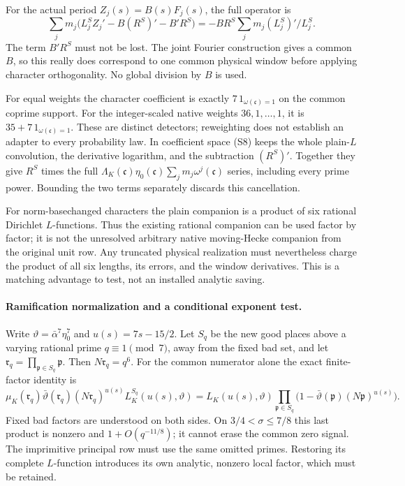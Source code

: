 \documentclass[11pt]{article}
\begin{document}
For the actual period \(Z_j(s)=B(s)F_j(s)\), the full operator is
\[
 \sum_jm_j\bigl(L_j^S Z_j'-B(R^S)'-B'R^S\bigr)
   =-BR^S\sum_jm_j(L_j^S)'/L_j^S .
 \tag{S8a}
\]
The term \(B'R^S\) must not be lost. The joint Fourier construction
gives a common \(B\), so this really does correspond to one common
physical window before applying character orthogonality. No global
division by \(B\) is used.

For equal weights the character coefficient is exactly
\(7\,1_{\omega(\mathfrak c)=1}\) on the common coprime support.
For the integer-scaled native weights \(36,1,\ldots,1\), it is
\(35+7\,1_{\omega(\mathfrak c)=1}\). These are distinct detectors;
reweighting does not establish an adapter to every probability law.
In coefficient space (S8) keeps the whole plain-\(L\) convolution,
the derivative logarithm, and the subtraction \((R^S)'\).
Together they give \(R^S\) times the full
\(\Lambda_K(\mathfrak c)\eta_0(\mathfrak c)
\sum_jm_j\omega^j(\mathfrak c)\) series, including every prime power.
Bounding the two terms separately discards this cancellation.

For norm-basechanged characters the plain companion is a product
of six rational Dirichlet \(L\)-functions. Thus the existing rational
companion can be used factor by factor; it is not the unresolved
arbitrary native moving-Hecke companion from the original unit row.
Any truncated physical realization must nevertheless charge the
product of all six lengths, its errors, and the window derivatives.
This is a matching advantage to test, not an installed analytic saving.

\paragraph{Ramification normalization and a conditional exponent test.}
Write \(\vartheta=\bar\alpha^7\eta_0^7\) and
\(u(s)=7s-15/2\). Let \(S_q\) be the new good places above a varying
rational prime \(q\equiv1\pmod7\), away from the fixed bad set, and
let \(\mathfrak r_q=\prod_{\mathfrak p\in S_q}\mathfrak p\).
Then \(N\mathfrak r_q=q^6\).
For the common numerator alone the exact finite-factor identity is
\[
 \mu_K(\mathfrak r_q)\bar\vartheta(\mathfrak r_q)
 (N\mathfrak r_q)^{u(s)}
 L_K^{S_q}(u(s),\vartheta)
 =
 L_K(u(s),\vartheta)
 \prod_{\mathfrak p\in S_q}
       \bigl(1-\bar\vartheta(\mathfrak p)(N\mathfrak p)^{u(s)}\bigr).
 \tag{S9}
\]
Fixed bad factors are understood on both sides.
On \(3/4<\sigma\le7/8\) this last product is nonzero and
\(1+O(q^{-11/8})\); it cannot erase the common zero signal.
The imprimitive principal row must use the same omitted primes.
Restoring its complete \(L\)-function introduces its own analytic,
nonzero local factor, which must be retained.
\end{document}
